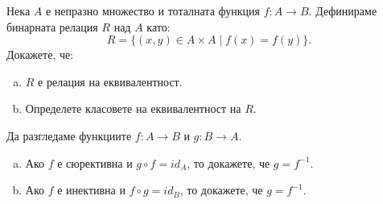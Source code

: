 \begin{problem}
  Нека $A$ е непразно множество и тоталната функция $f:A \to B$.
  Дефинираме бинарната релация $R$ над $A$ като:
  \[R = \{(x,y) \in A\times A\mid f(x) = f(y)\}.\]
  Докажете, че:
  \begin{enumerate}[a)]
  \item
    $R$ е релация на еквивалентност.
  \item
    Определете класовете на еквивалентност на $R$.
\end{enumerate}
\end{problem}

\begin{problem}
  Да разгледаме функциите $f:A\to B$ и $g:B\to A$.
  \begin{enumerate}[a)]
  \item 
    Ако $f$ е сюрективна и $g\circ f = id_A$, то докажете, че $g = f^{-1}$.
  \item
    Ако $f$ е инективна и $f\circ g = id_B$, то докажете, че $g = f^{-1}$.
  \end{enumerate}
\end{problem}

